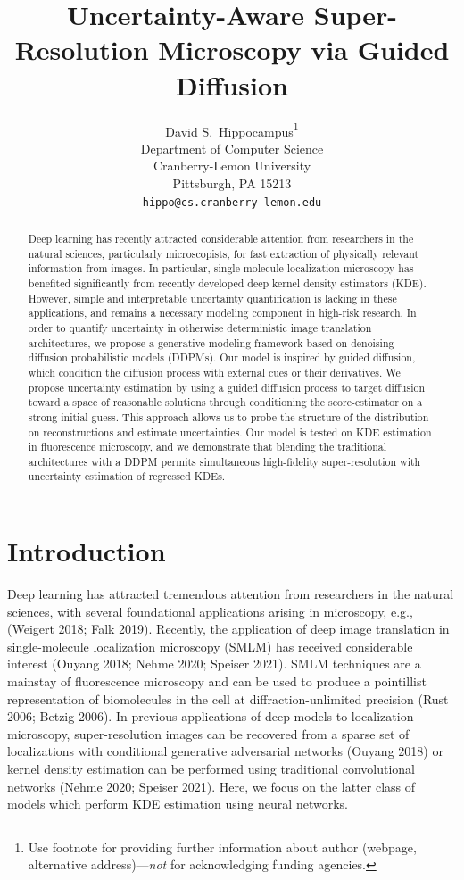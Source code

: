 \documentclass{article}
\title{Uncertainty-Aware Super-Resolution Microscopy via Guided Diffusion}
\author{%
  David S.~Hippocampus\thanks{Use footnote for providing further information
    about author (webpage, alternative address)---\emph{not} for acknowledging
    funding agencies.} \\
  Department of Computer Science\\
  Cranberry-Lemon University\\
  Pittsburgh, PA 15213 \\
  \texttt{hippo@cs.cranberry-lemon.edu} \\
}
\begin{document}
\maketitle


\begin{abstract}

Deep learning has recently attracted considerable attention from researchers in the natural sciences, particularly microscopists, for fast extraction of physically relevant information from images. In particular, single molecule localization microscopy has benefited significantly from recently developed deep kernel density estimators (KDE). However, simple and interpretable uncertainty quantification is lacking in these applications, and remains a necessary modeling component in high-risk research. In order to quantify uncertainty in otherwise deterministic image translation architectures, we propose a generative modeling framework based on denoising diffusion probabilistic models (DDPMs). Our model is inspired by guided diffusion, which condition the diffusion process with external cues or their derivatives. We propose uncertainty estimation by using a guided diffusion process to target diffusion toward a space of reasonable solutions through conditioning the score-estimator on a strong initial guess. This approach allows us to probe the structure of the distribution on reconstructions and estimate uncertainties. Our model is tested on KDE estimation in fluorescence microscopy, and we demonstrate that blending the traditional architectures with a DDPM permits simultaneous high-fidelity super-resolution with uncertainty estimation of regressed KDEs. 
\end{abstract}

\section{Introduction}

Deep learning has attracted tremendous attention from researchers in the natural sciences, with several foundational applications arising in microscopy, e.g., (Weigert 2018; Falk 2019). Recently, the application of deep image translation in single-molecule localization microscopy (SMLM) has received considerable interest (Ouyang 2018; Nehme 2020; Speiser 2021). SMLM techniques are a mainstay of fluorescence microscopy and can be used to produce a pointillist representation of biomolecules in the cell at diffraction-unlimited precision (Rust 2006; Betzig 2006). In previous applications of deep models to localization microscopy, super-resolution images can be recovered from a sparse set of localizations with conditional generative adversarial networks (Ouyang 2018) or kernel density estimation can be performed using traditional convolutional networks (Nehme 2020; Speiser 2021). Here, we focus on the latter class of models which perform KDE estimation using neural networks. 
\end{document}
